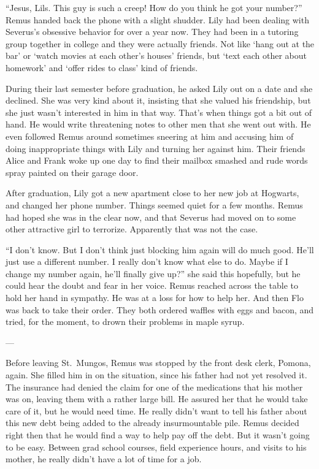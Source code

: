 \documentclass[12pt,twoside,openright]{memoir}
\begin{document}
``Jesus, Lils. This guy is such a creep! How do you think he got your number?'' Remus handed back the phone with a slight shudder. Lily had been dealing with Severus's obsessive behavior for over a year now. They had been in a tutoring group together in college and they were actually friends. Not like ‘hang out at the bar' or ‘watch movies at each other's houses' friends, but ‘text each other about homework' and ‘offer rides to class' kind of friends. 

During their last semester before graduation, he asked Lily out on a date and she declined. She was very kind about it, insisting that she valued his friendship, but she just wasn't interested in him in that way. That's when things got a bit out of hand. He would write threatening notes to other men that she went out with. He even followed Remus around sometimes sneering at him and accusing him of doing inappropriate things with Lily and turning her against him. Their friends Alice and Frank woke up one day to find their mailbox smashed and rude words spray painted on their garage door.

After graduation, Lily got a new apartment close to her new job at Hogwarts, and changed her phone number. Things seemed quiet for a few months. Remus had hoped she was in the clear now, and that Severus had moved on to some other attractive girl to terrorize. Apparently that was not the case.

``I don't know. But I don't think just blocking him again will do much good. He'll just use a different number. I really don't know what else to do. Maybe if I change my number again, he'll finally give up?'' she said this hopefully, but he could hear the doubt and fear in her voice. Remus reached across the table to hold her hand in sympathy. He was at a loss for how to help her. And then Flo was back to take their order. They both ordered waffles with eggs and bacon, and tried, for the moment, to drown their problems in maple syrup.

---

Before leaving St.\ Mungos, Remus was stopped by the front desk clerk, Pomona, again. She filled him in on the situation, since his father had not yet resolved it. The insurance had denied the claim for one of the medications that his mother was on, leaving them with a rather large bill. He assured her that he would take care of it, but he would need time. He really didn't want to tell his father about this new debt being added to the already insurmountable pile. Remus decided right then that he would find a way to help pay off the debt. But it wasn't going to be easy. Between grad school courses, field experience hours, and visits to his mother, he really didn't have a lot of time for a job.
\end{document}
